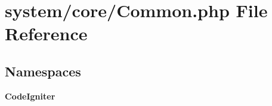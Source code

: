 \section{system/core/\-Common.php File Reference}
\label{_common_8php}
\subsection*{Namespaces}
\begin{DoxyCompactItemize}
\item 
{\bf Code\-Igniter}
\end{DoxyCompactItemize}
